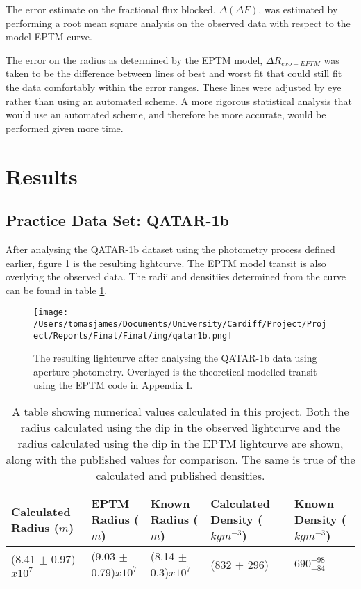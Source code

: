 \documentclass{report}
\begin{document}
The error estimate on the fractional flux blocked, $\Delta(\Delta F)$, was estimated by performing a root mean square analysis on the observed data with respect to the model EPTM curve. 

The error on the radius as determined by the EPTM model, $\Delta R_{exo-EPTM}$ was taken to be the difference between lines of best and worst fit that could still fit the data comfortably within the error ranges. These lines were adjusted by eye rather than using an automated scheme. A more rigorous statistical analysis that would use an automated scheme, and therefore be more accurate, would be performed given more time. 


\section{Results}

\subsection{Practice Data Set: QATAR-1b}
After analysing the QATAR-1b dataset using the photometry process defined earlier, figure \ref{qatar} is the resulting lightcurve. The EPTM model transit is also overlying the observed data. The radii and densitiies determined from the curve can be found in table \ref{qatar1bresults}.

\begin{figure}[H]
\centering
    \texttt{[image: /Users/tomasjames/Documents/University/Cardiff/Project/Project/Reports/Final/Final/img/qatar1b.png]}
\caption[The resulting lightcurve after analysing the QATAR-1b data using aperture photometry. Overlayed is the theoretical modelled transit using the EPTM code in Appendix I.]{The resulting lightcurve after analysing the QATAR-1b data using aperture photometry. Overlayed is the theoretical modelled transit using the EPTM code in Appendix I.} \label{qatar}
\end{figure}


\begin{table}[h]
\begin{tabular}{|l|l|l|l|l|}
\hline \hline
Calculated Radius ($m$) & EPTM Radius ($m$)    & Known Radius ($m$) & Calculated Density ($kg m^{-3}$) & Known Density ($kg m^{-3}$) \\ \hline \hline
(8.41 $\pm$ 0.97)$x10^7$    & (9.03 $\pm$ 0.79)$x10^7$ & (8.14 $\pm$ 0.3)$x10^7$      & (832 $\pm$ 296)                  & ${{690}_{-84}^{+98}}$     \\ \hline
\end{tabular}
\caption{A table showing numerical values calculated in this project. Both the radius calculated using the dip in the observed lightcurve and the radius calculated using the dip in the EPTM lightcurve are shown, along with the published values for comparison. The same is true of the calculated and published densities.}
\label{qatar1bresults}
\end{table}
\end{document}
